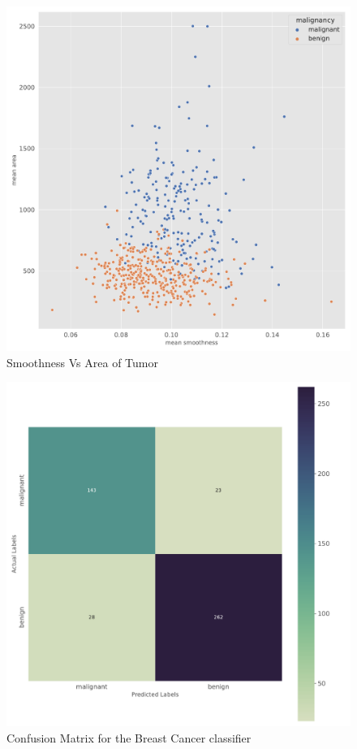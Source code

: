 \documentclass[a4paper,12pt]{article}
\begin{document}
\begin{figure}[H]
  \centering
  \includegraphics[scale = 0.5]{Task5/smoothVArea.pdf}
  \caption{Smoothness Vs Area of Tumor}
  \label{fig:smoothnessVArea}
\end{figure}
\begin{figure}[H]
  \centering
  \includegraphics[scale = 0.5]{Task5/confM.pdf}
  \caption{Confusion Matrix for the Breast Cancer classifier}
  \label{fig:confM}
\end{figure}
\end{document}
